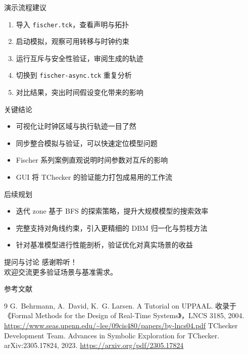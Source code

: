 \documentclass{beamer}
\begin{document}
\begin{frame}{演示流程建议}
  \begin{enumerate}
    \item 导入 \texttt{fischer.tck}，查看声明与拓扑
    \item 启动模拟，观察可用转移与时钟约束
    \item 运行互斥与安全性验证，审阅生成的轨迹
    \item 切换到 \texttt{fischer-async.tck} 重复分析
    \item 对比结果，突出时间假设变化带来的影响
  \end{enumerate}
\end{frame}

\begin{frame}{关键结论}
  \begin{itemize}
    \item 可视化让时钟区域与执行轨迹一目了然
    \item 同步整合模拟与验证，可以快速定位模型问题
    \item Fischer 系列案例直观说明时间参数对互斥的影响
    \item GUI 将 TChecker 的验证能力打包成易用的工作流
  \end{itemize}
\end{frame}

\begin{frame}{后续规划}
  \begin{itemize}
    \item 迭代 zone 基于 BFS 的探索策略，提升大规模模型的搜索效率
    \item 完整支持对角线约束，引入更精细的 DBM 归一化与剪枝方法
    \item 针对基准模型进行性能剖析，验证优化对真实场景的收益
  \end{itemize}
\end{frame}

\begin{frame}{提问与讨论}
  \centering
  感谢聆听！\\
  欢迎交流更多验证场景与基准需求。
\end{frame}

\begin{frame}{参考文献}
  \begin{thebibliography}{9}
      G.~Behrmann, A.~David, K.~G. Larsen.
      \newblock A Tutorial on UPPAAL.
      \newblock 收录于《Formal Methods for the Design of Real-Time Systems》，LNCS 3185, 2004.
      \newblock \url{https://www.seas.upenn.edu/~lee/09cis480/papers/by-lncs04.pdf}
      TChecker Development Team.
      \newblock Advances in Symbolic Exploration for TChecker.
      \newblock arXiv:2305.17824, 2023.
      \newblock \url{https://arxiv.org/pdf/2305.17824}
  \end{thebibliography}
\end{frame}
\end{document}
